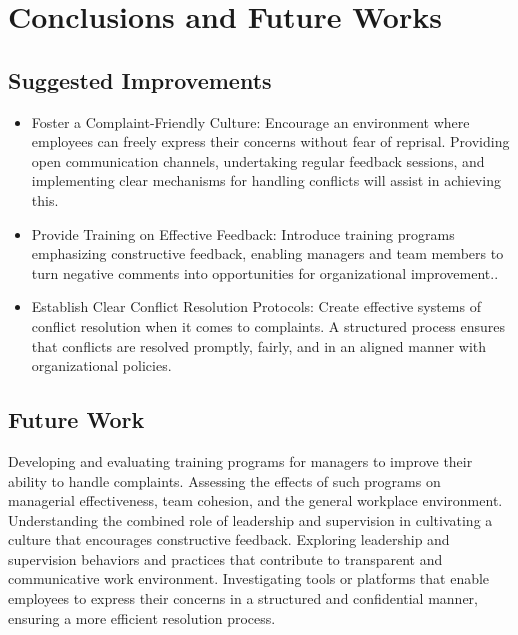 \documentclass[a4paper,12pt]{article}
\begin{document}
\newpage
\section{Conclusions and Future Works}

\subsection{Suggested Improvements}
\begin{itemize}
    \item Foster a Complaint-Friendly Culture:
Encourage an environment where employees can freely express their concerns without fear of reprisal. Providing open communication channels, undertaking regular feedback sessions, and implementing clear mechanisms for handling conflicts will assist in achieving this.

    \item Provide Training on Effective Feedback:
Introduce training programs emphasizing constructive feedback, enabling managers and team members to turn negative comments into opportunities for organizational improvement.\cite{feedback_importance}.

    \item Establish Clear Conflict Resolution Protocols:
Create effective systems of conflict resolution when it comes to complaints. A structured process ensures that conflicts are resolved promptly, fairly, and in an aligned manner with organizational policies\cite{conflict_management}.
\end{itemize}
\subsection{Future Work}
Developing and evaluating training programs for managers to improve their ability to handle complaints. Assessing the effects of such programs on managerial effectiveness, team cohesion, and the general workplace environment.
Understanding the combined role of leadership and supervision in cultivating a culture that encourages constructive feedback. Exploring leadership and supervision behaviors and practices that contribute to transparent and communicative work environment\cite{workplace_emotions}. Investigating tools or platforms that enable employees to express their concerns in a structured and confidential manner, ensuring a more efficient resolution process.
\end{document}
